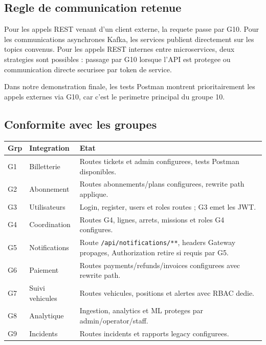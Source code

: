 \documentclass[12pt,a4paper]{article}
\begin{document}
\subsection{Regle de communication retenue}

Pour les appels REST venant d'un client externe, la requete passe par G10. Pour les communications asynchrones Kafka, les services publient directement sur les topics convenus. Pour les appels REST internes entre microservices, deux strategies sont possibles : passage par G10 lorsque l'API est protegee ou communication directe securisee par token de service.

\begin{infoBox}
Dans notre demonstration finale, les tests Postman montrent prioritairement les appels externes via G10, car c'est le perimetre principal du groupe 10.
\end{infoBox}

\subsection{Conformite avec les groupes}

\begin{longtable}{p{1.2cm}p{4cm}p{9cm}}
\toprule
\textbf{Grp} & \textbf{Integration} & \textbf{Etat} \\
\midrule
G1 & Billetterie & Routes tickets et admin configurees, tests Postman disponibles. \\
G2 & Abonnement & Routes abonnements/plans configurees, rewrite path applique. \\
G3 & Utilisateurs & Login, register, users et roles routes ; G3 emet les JWT. \\
G4 & Coordination & Routes G4, lignes, arrets, missions et roles G4 configures. \\
G5 & Notifications & Route \texttt{/api/notifications/**}, headers Gateway propages, Authorization retire si requis par G5. \\
G6 & Paiement & Routes payments/refunds/invoices configurees avec rewrite path. \\
G7 & Suivi vehicules & Routes vehicules, positions et alertes avec RBAC dedie. \\
G8 & Analytique & Ingestion, analytics et ML proteges par admin/operator/staff. \\
G9 & Incidents & Routes incidents et rapports legacy configurees. \\
\bottomrule
\end{longtable}
\end{document}
